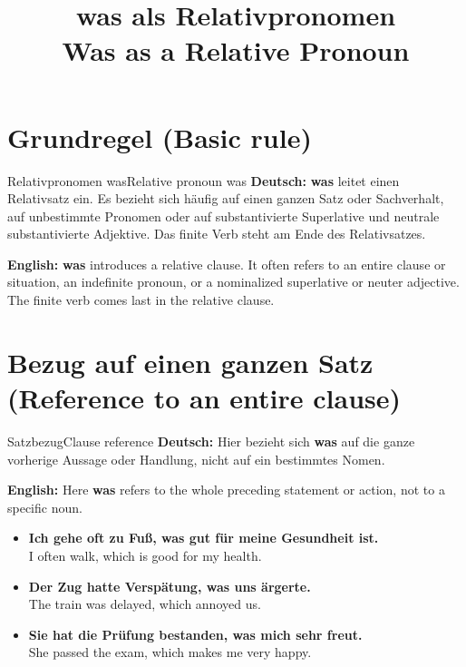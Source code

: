 \documentclass[a4paper,11pt]{article}
\title{\glqq was\grqq{} als Relativpronomen\\\large Was as a Relative Pronoun}
\date{}
\newcommand{\GermanText}[1]{\textbf{Deutsch: }#1\par}
\newcommand{\EnglishText}[1]{{\small\color{SoftGray}\textbf{English: }#1\par}}
\newcommand{\ExampleItem}[2]{\item \textbf{#1}\\{\small\color{SoftGray}#2}}
\begin{document}
   \maketitle\tableofcontents\newpage
   \section{Grundregel (Basic rule)}
      \begin{grammarentry}{Relativpronomen was}{Relative pronoun was}
         \GermanText{\textbf{was} leitet einen Relativsatz ein. Es bezieht sich häufig auf einen ganzen Satz oder Sachverhalt, auf unbestimmte Pronomen oder auf substantivierte Superlative und neutrale substantivierte Adjektive. Das finite Verb steht am Ende des Relativsatzes.}
         \EnglishText{\textbf{was} introduces a relative clause. It often refers to an entire clause or situation, an indefinite pronoun, or a nominalized superlative or neuter adjective. The finite verb comes last in the relative clause.}
      \end{grammarentry}
   \section{Bezug auf einen ganzen Satz (Reference to an entire clause)}
      \begin{grammarentry}{Satzbezug}{Clause reference}
         \GermanText{Hier bezieht sich \textbf{was} auf die ganze vorherige Aussage oder Handlung, nicht auf ein bestimmtes Nomen.}
         \EnglishText{Here \textbf{was} refers to the whole preceding statement or action, not to a specific noun.}
      \end{grammarentry}
      \begin{exbox}\begin{itemize}
         \ExampleItem{Ich gehe oft zu Fuß, was gut für meine Gesundheit ist.}{I often walk, which is good for my health.}
         \ExampleItem{Der Zug hatte Verspätung, was uns ärgerte.}{The train was delayed, which annoyed us.}
         \ExampleItem{Sie hat die Prüfung bestanden, was mich sehr freut.}{She passed the exam, which makes me very happy.}
         \end{itemize}\end{exbox}
\end{document}
